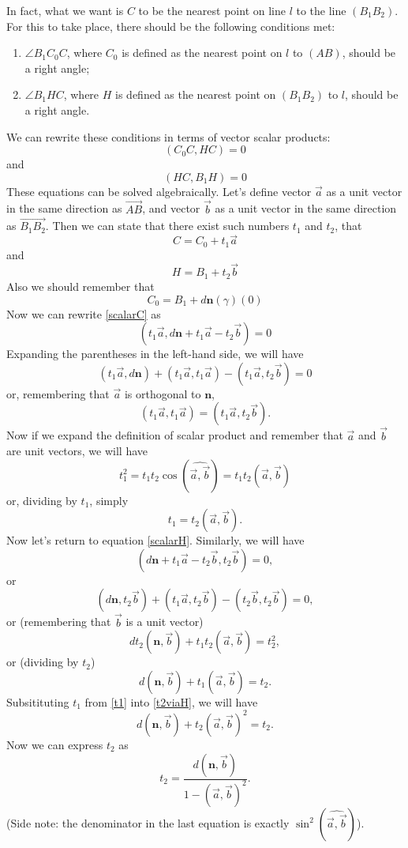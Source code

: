 \documentclass[12pt,a4paper]{article}
\newcommand{\vc}{\overrightarrow}
\begin{document}
In fact, what we want is $C$ to be the nearest point on line $l$ to the line $(B_1B_2)$. For this to take place, there should be the following conditions met:
\begin{enumerate}
  \item $\angle B_1C_0C$, where $C_0$ is defined as the nearest point on $l$ to $(AB)$, should be a right angle;
  \item $\angle B_1HC$, where $H$ is defined as the nearest point on $(B_1B_2)$ to $l$, should be a right angle.
\end{enumerate}
We can rewrite these conditions in terms of vector scalar products:
\begin{equation}\label{scalarC}
(C_0C, HC) = 0
\end{equation}
and
\begin{equation}\label{scalarH}
(HC, B_1H) = 0
\end{equation}
These equations can be solved algebraically. Let's define vector $\vec a$ as a unit vector in the same direction as $\vc{AB}$, and vector $\vec b$ as a unit vector in the same direction as $\vc{B_1B_2}$. Then we can state that there exist such numbers $t_1$ and $t_2$, that
\begin{equation}\label{Cfromt1}
C = C_0 + t_1\vec{a}
\end{equation}
and
$$
H = B_1 + t_2\vec{b}
$$
Also we should remember that
$$
C_0 = B_1 + d\mathbf{n}(\gamma)(0)
$$
Now we can rewrite \eqref{scalarC} as
$$
(t_1\vec{a}, d\mathbf{n} + t_1\vec{a} - t_2\vec{b}) = 0
$$
Expanding the parentheses in the left-hand side, we will have
$$
  (t_1\vec{a}, d\mathbf{n}) + (t_1\vec{a}, t_1\vec{a}) - (t_1\vec{a}, t_2\vec{b}) = 0
$$
or, remembering that $\vec{a}$ is orthogonal to $\mathbf{n}$,
$$
(t_1\vec{a}, t_1\vec{a}) = (t_1\vec{a}, t_2\vec{b}).
$$
Now if we expand the definition of scalar product and remember that $\vec{a}$ and $\vec{b}$ are unit vectors, we will have
$$
t_1^2 = t_1t_2\cos(\widehat{\vec{a}, \vec{b}}) = t_1t_2(\vec{a}, \vec{b})
$$
or, dividing by $t_1$, simply
\begin{equation}\label{t1}
t_1 = t_2(\vec{a}, \vec{b}).
\end{equation}
Now let's return to equation \eqref{scalarH}. Similarly, we will have
$$
(d\mathbf{n} + t_1\vec{a} - t_2\vec{b}, t_2\vec{b}) = 0,
$$
or
$$
(d\mathbf{n}, t_2\vec{b}) + (t_1\vec{a}, t_2\vec{b}) - (t_2\vec{b}, t_2\vec{b}) = 0,
$$
or (remembering that $\vec{b}$ is a unit vector)
$$
dt_2(\mathbf{n},\vec{b}) + t_1t_2(\vec{a}, \vec{b}) = t_2^2,
$$
or (dividing by $t_2$)
\begin{equation}\label{t2viaH}
d(\mathbf{n}, \vec{b}) + t_1(\vec{a}, \vec{b}) = t_2.
\end{equation}
Subsitituting $t_1$ from \eqref{t1} into \eqref{t2viaH}, we will have
$$
d(\mathbf{n}, \vec{b}) + t_2(\vec{a}, \vec{b})^2 = t_2.
$$
Now we can express $t_2$ as
\begin{equation}\label{t2}
  t_2 = \frac{d(\mathbf{n}, \vec{b})}{1 - (\vec{a}, \vec{b})^2}.
\end{equation}
(Side note: the denominator in the last equation is exactly $\sin^2(\widehat{\vec{a}, \vec{b}})$).
\end{document}
